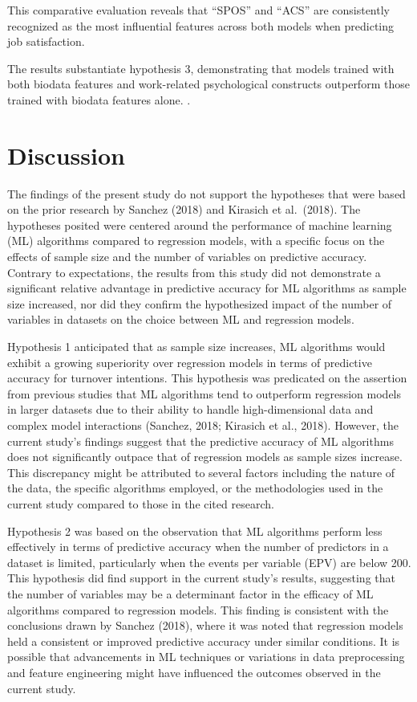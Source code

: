 \documentclass[
  man]{apa7}
\begin{document}
This comparative evaluation reveals that ``SPOS'' and ``ACS'' are consistently recognized as the most influential features across both models when predicting job satisfaction.

The results substantiate hypothesis 3, demonstrating that models trained with both biodata features and work-related psychological constructs outperform those trained with biodata features alone. .

\section{Discussion}\label{discussion}

The findings of the present study do not support the hypotheses that were based on the prior research by Sanchez (2018) and Kirasich et al.~(2018). The hypotheses posited were centered around the performance of machine learning (ML) algorithms compared to regression models, with a specific focus on the effects of sample size and the number of variables on predictive accuracy. Contrary to expectations, the results from this study did not demonstrate a significant relative advantage in predictive accuracy for ML algorithms as sample size increased, nor did they confirm the hypothesized impact of the number of variables in datasets on the choice between ML and regression models.

Hypothesis 1 anticipated that as sample size increases, ML algorithms would exhibit a growing superiority over regression models in terms of predictive accuracy for turnover intentions. This hypothesis was predicated on the assertion from previous studies that ML algorithms tend to outperform regression models in larger datasets due to their ability to handle high-dimensional data and complex model interactions (Sanchez, 2018; Kirasich et al., 2018). However, the current study's findings suggest that the predictive accuracy of ML algorithms does not significantly outpace that of regression models as sample sizes increase. This discrepancy might be attributed to several factors including the nature of the data, the specific algorithms employed, or the methodologies used in the current study compared to those in the cited research.

Hypothesis 2 was based on the observation that ML algorithms perform less effectively in terms of predictive accuracy when the number of predictors in a dataset is limited, particularly when the events per variable (EPV) are below 200. This hypothesis did find support in the current study's results, suggesting that the number of variables may be a determinant factor in the efficacy of ML algorithms compared to regression models. This finding is consistent with the conclusions drawn by Sanchez (2018), where it was noted that regression models held a consistent or improved predictive accuracy under similar conditions. It is possible that advancements in ML techniques or variations in data preprocessing and feature engineering might have influenced the outcomes observed in the current study.
\end{document}
